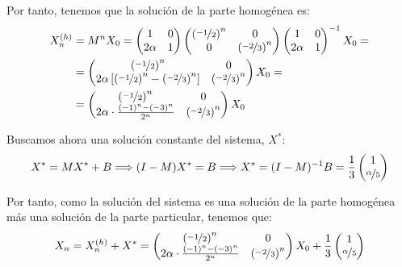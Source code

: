\begin{ejercicio}
\begin{enumerate}
    Por tanto, tenemos que la solución de la parte homogénea es:
    \begin{align*}
        X_n^{(h)} &= M^nX_0
        = \begin{pmatrix}
            1 & 0\\
            2\alpha & 1
        \end{pmatrix}\begin{pmatrix}
            \left(\nicefrac{-1}{2}\right)^n & 0\\
            0 & \left(\nicefrac{-2}{3}\right)^n
        \end{pmatrix}
        \begin{pmatrix}
            1 & 0\\
            2\alpha & 1
        \end{pmatrix}^{-1}X_0 =\\
        &= \begin{pmatrix}
            \left(\nicefrac{-1}{2}\right)^n & 0\\
            2\alpha\left[\left(\nicefrac{-1}{2}\right)^n - \left(\nicefrac{-2}{3}\right)^n\right] & \left(\nicefrac{-2}{3}\right)^n
        \end{pmatrix}X_0 =\\
        &= \begin{pmatrix}
            \left(\nicefrac{-1}{2}\right)^n & 0\\
            2\alpha\cdot \frac{(-1)^n -(-3)^n}{2^n} & \left(\nicefrac{-2}{3}\right)^n
        \end{pmatrix}X_0
    \end{align*}

    Buscamos ahora una solución constante del sistema, $X^\ast$:
    \begin{equation*}
        X^\ast = MX^\ast + B
        \Longrightarrow
        (I-M)X^\ast = B
        \Longrightarrow
        X^\ast = (I-M)^{-1}B = \frac{1}{3}\begin{pmatrix}
            1 \\ \nicefrac{\alpha}{5}
        \end{pmatrix}
    \end{equation*}

    Por tanto, como la solución del sistema es una solución de la parte homogénea más
    una solución de la parte particular, tenemos que:
    \begin{equation*}
        X_n = X_n^{(h)} + X^\ast
        = \begin{pmatrix}
            \left(\nicefrac{-1}{2}\right)^n & 0\\
            2\alpha\cdot \frac{(-1)^n -(-3)^n}{2^n} & \left(\nicefrac{-2}{3}\right)^n
        \end{pmatrix}X_0 + \frac{1}{3}\begin{pmatrix}
            1 \\ \nicefrac{\alpha}{5}
        \end{pmatrix}
    \end{equation*}
\end{enumerate}
\end{ejercicio}

